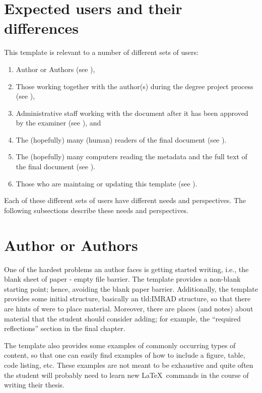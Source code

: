 \section{Expected users and their differences}
\label{sec:expectedUsers}
This template is relevant to a number of different sets of users:
\begin{enumerate}[leftmargin=*,label=\textbf{Users \arabic*}, ref={Users \arabic*}]
    \item \label{users:authors} Author or Authors (see ),
    \item \label{users:others} Those working together with the author(s) during the degree project process (see ),
    \item \label{users:admins} Administrative staff working with the document after it has been approved by the examiner (see ), and
    \item \label{users:readers} The (hopefully) many (human) readers of the final document (see ).
    \item \label{users:searchEngines} The (hopefully) many computers reading the metadata and the full text of the final document (see ).
    \item \label{users:maintainer} Those who are maintaing or updating this template (see ).
\end{enumerate}

Each of these different sets of users have different needs and perspectives. The following subsections describe these needs and perspectives.

\section{Author or Authors}
\label{sec:authors}
One of the hardest problems an author faces is getting started writing, i.e., the blank sheet of paper - empty file barrier. The template provides a non-blank starting point; hence, avoiding the blank paper barrier. Additionally, the template provides some initial structure, basically an  \gls{tld:IMRAD} structure, so that there are hints of were to place material. Moreover, there are places (and notes) about material that the student should consider adding; for example, the ``required reflections'' section in the final chapter.

The template also provides some examples of commonly occurring types of content, so that one can easily find examples of how to include a figure, table, code listing, etc. These examples are not meant to be exhaustive and quite often the student will probably need to learn new \LaTeX\ commands in the course of writing their thesis.

